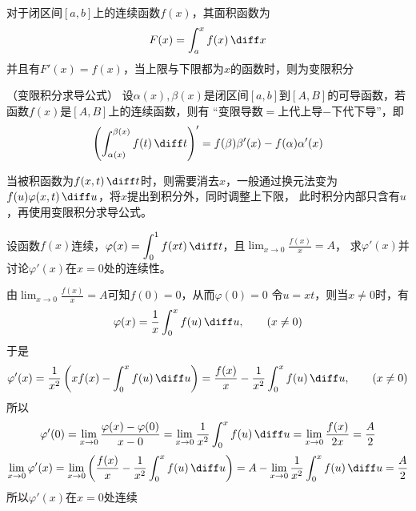 对于闭区间$[a,b]$上的连续函数$f(x)$，其面积函数为
\[ F(x) = \int_a^xf(x)\,\diff x \]
并且有$F'(x)=f(x)$，当上限与下限都为$x$的函数时，则为变限积分
\begin{theorem}
    （变限积分求导公式）
    \label{th:变限积分求导公式}
    设$\alpha(x),\beta(x)$是闭区间$[a,b]$到$[A,B]$的可导函数，若函数$f(x)$是$[A,B]$上的连续函数，则有
    “变限导数$=$上代上导$-$下代下导”，即
    \[
        \left( \int_{\alpha(x)}^{\beta(x)}f(t)\,\diff t \right)'
        =
        f(\beta)\beta'(x) - f(\alpha)\alpha'(x)
    \]
\end{theorem}
当被积函数为$f(x,t)\,\diff t$时，则需要消去$x$，一般通过换元法变为$f(u)\varphi(x,t)\,\diff u$，将$x$提出到积分外，同时调整上下限，
此时积分内部只含有$u$，再使用变限积分求导公式。
\begin{example}
    设函数$f(x)$连续，$\displaystyle\varphi(x)=\int_0^1f(xt)\,\diff t$，且$\displaystyle\lim_{x\to 0}\frac{f(x)}{x}=A$，
    求$\varphi'(x)$并讨论$\varphi'(x)$在$x=0$处的连续性。
\end{example}
\begin{solution}
    由$\displaystyle\lim_{x\to 0}\frac{f(x)}{x}=A$可知$f(0)=0$，从而$\varphi(0)=0$
    令$u=xt$，则当$x\neq 0$时，有
    \[ \varphi(x) = \frac{1}{x}\int_0^x f(u)\,\diff u ,\qquad (x\neq 0)\]
    于是
    \[
        \varphi'(x)
        =
        \frac{1}{x^2}\left(xf(x) - \int_0^xf(u)\,\diff u\right)
        = \frac{f(x)}{x} - \frac{1}{x^2}\int_0^xf(u)\,\diff u,\qquad (x\neq 0)
    \]
    所以
    \[
        \varphi'(0)
        =
        \lim_{x\to 0}\frac{\varphi(x)-\varphi(0)}{x-0}
        =
        \lim_{x\to 0}\frac{1}{x^2}\int_0^x f(u)\,\diff u
        =
        \lim_{x\to 0}\frac{f(x)}{2x}
        =
        \frac{A}{2}
    \]
    \[
        \lim_{x\to 0}\varphi'(x)
        =
        \lim_{x\to 0}\left(\frac{f(x)}{x} - \frac{1}{x^2}\int_0^xf(u)\,\diff u\right)
        =
        A -  \lim_{x\to 0}\frac{1}{x^2}\int_0^x f(u)\,\diff u
        =
        \frac{A}{2}
    \]
    所以$\varphi'(x)$在$x=0$处连续
\end{solution}

